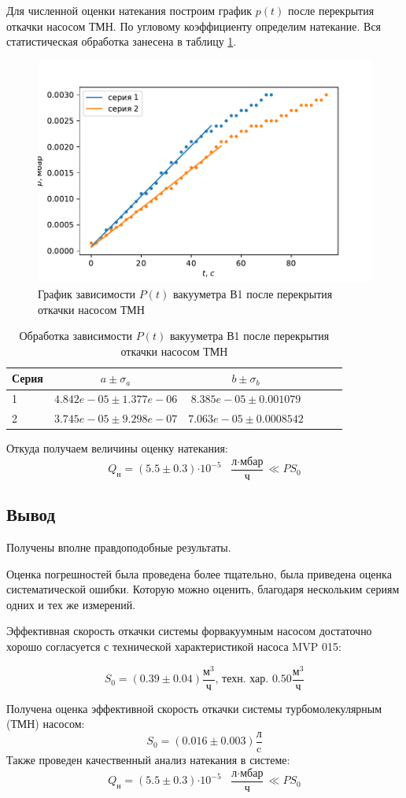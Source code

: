 \documentclass[12pt,a4paper]{article}
\newcommand{\e}[1]{\text{$\cdot10^{#1}$}}
\begin{document}
Для численной оценки натекания построим график $p(t)$ после перекрытия откачки насосом ТМН.
По угловому коэффициенту определим натекание. Вся статистическая обработка занесена в таблицу \ref{tab:natek}.

\begin{figure}[H]
	\caption{График зависимости $P(t)$ вакууметра В1 после перекрытия откачки насосом ТМН}
	\label{fig:natek}
	\centering
	\includegraphics[width = 11 cm]{res/natek.pdf}
\end{figure}

\begin{table}[H]	
	\caption{Обработка зависимости $P(t)$ вакууметра В1 после перекрытия откачки насосом ТМН}
	\label{tab:natek}
	\centering
	\footnotesize
	\begin{tabular}{lccccc}
		\toprule
		
		Серия & $a \pm \sigma_a$ & $b \pm \sigma_b$ \\
		\midrule
		1&$4.842e-05 \pm 1.377e-06$     &    $8.385e-05 \pm 0.001079$  \\
		2&$3.745e-05 \pm 9.298e-07$     &    $7.063e-05 \pm 0.0008542$ \\
		\bottomrule
	\end{tabular}
\end{table}


Откуда получаем величины оценку натекания: 
$$Q_{\text{н}} = (5.5 \pm 0.3)\e{-5}\text{ }\frac{\text{л}\cdot\text{мбар}}{\text{ч}}\ll PS_0$$

\subsection*{Вывод}

Получены вполне правдоподобные результаты. 

Оценка погрешностей была проведена более тщательно, была приведена оценка систематической ошибки. Которую можно оценить, благодаря нескольким сериям одних и тех же измерений.

Эффективная скорость откачки системы форвакуумным насосом достаточно хорошо согласуется с технической характеристикой насоса MVP 015:

$$S_0 = (0.39 \pm 0.04) \frac{\text{м}^3}{\text{ч}}\text{, техн. хар. } 0.50\frac{\text{м}^3}{\text{ч}}$$

Получена оценка эффективной скорость откачки системы турбомолекулярным (ТМН) насосом:
$$S_0 = (0.016 \pm 0.003) \frac{\text{л}}{\text{c}}$$
Также проведен качественный анализ натекания в системе:
$$Q_{\text{н}} = (5.5 \pm 0.3)\e{-5}\text{ }\frac{\text{л}\cdot\text{мбар}}{\text{ч}}\ll PS_0$$
\end{document}
